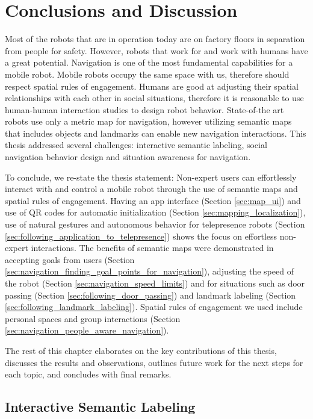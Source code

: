 \chapter{Conclusions and Discussion}
\label{chapter:conclusion}

Most of the robots that are in operation today are on factory floors in separation from people for safety. However, robots that work for and work with humans have a great potential. Navigation is one of the most fundamental capabilities for a mobile robot. Mobile robots occupy the same space with us, therefore should respect spatial rules of engagement. Humans are good at adjusting their spatial relationships with each other in social situations, therefore it is reasonable to use human-human interaction studies to design robot behavior. State-of-the art robots use only a metric map for navigation, however utilizing semantic maps that includes objects and landmarks can enable new navigation interactions. This thesis addressed several challenges: interactive semantic labeling, social navigation behavior design and situation awareness for navigation. 

To conclude, we re-state the thesis statement: Non-expert users can effortlessly interact with and control a mobile robot through the use of semantic maps and spatial rules of engagement. Having an app interface (Section \ref{sec:map_ui}) and use of QR codes for automatic initialization (Section \ref{sec:mapping_localization}), use of natural gestures and autonomous behavior for telepresence robots (Section \ref{sec:following_application_to_telepresence}) shows the focus on effortless non-expert interactions. The benefits of semantic maps were demonstrated in accepting goals from users (Section \ref{sec:navigation_finding_goal_points_for_navigation}), adjusting the speed of the robot (Section \ref{sec:navigation_speed_limits}) and for situations such as door passing (Section \ref{sec:following_door_passing}) and landmark labeling (Section \ref{sec:following_landmark_labeling}). Spatial rules of engagement we used include personal spaces and group interactions (Section \ref{sec:navigation_people_aware_navigation}).

The rest of this chapter elaborates on the key contributions of this thesis, discusses the results and observations, outlines future work for the next steps for each topic, and concludes with final remarks.

\section{Interactive Semantic Labeling}

